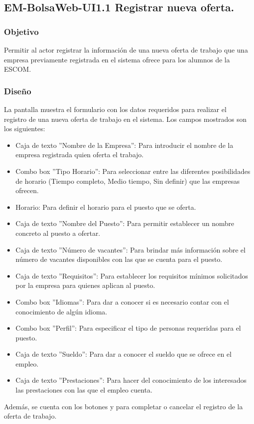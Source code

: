 
	
\subsection{EM-BolsaWeb-UI1.1 Registrar nueva oferta.}

\subsubsection{Objetivo}
	\noindent
	Permitir al actor registrar la información de una nueva oferta de trabajo que una empresa previamente registrada en el sistema ofrece para los alumnos de la ESCOM. 

\subsubsection{Diseño}
	\noindent
	La pantalla muestra el formulario con los datos requeridos para realizar el registro de una nueva oferta de trabajo en el sistema.
	Los campos mostrados son los siguientes: 
	\begin{itemize}
		\item Caja de texto ''Nombre de la Empresa'': Para introducir el nombre de la empresa registrada quien oferta el trabajo.
		\item Combo box ''Tipo Horario'': Para seleccionar entre las diferentes posibilidades de horario (Tiempo completo, Medio tiempo, Sin definir) que las empresas ofrecen.
		\item Horario: Para definir el horario para el puesto que se oferta.
		\item Caja de texto ''Nombre del Puesto'': Para permitir establecer un nombre concreto al puesto a ofertar.
		\item Caja de texto ''Número de vacantes'': Para brindar más información sobre el número de vacantes disponibles con las que se cuenta para el puesto.
		\item Caja de texto ''Requisitos'': Para establecer los requisitos mínimos solicitados por la empresa para quienes aplican al puesto.
		\item Combo box ''Idiomas'': Para dar a conocer si es necesario contar con el conocimiento de algún idioma.
		\item Combo box ''Perfil'': Para especificar el tipo de personas requeridas para el puesto.
		\item Caja de texto ''Sueldo'': Para dar a conocer el sueldo que se ofrece en el empleo.
		\item Caja de texto ''Prestaciones'': Para hacer del conocimiento de los interesados las prestaciones con las que el empleo cuenta.
	\end{itemize}
	Además, se cuenta con los botones  y  para completar o cancelar el registro de la oferta de trabajo.

